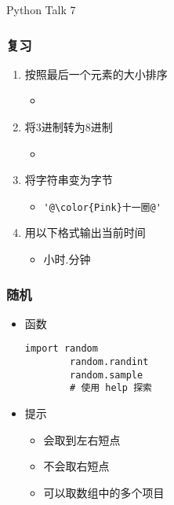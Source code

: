 


\begin{CJK}{UTF8}{gbsn}

\PreFirstFrame
\begin{frame} [fragile]
	\centerline{\fontsize{42}{42}\selectfont Python Talk 7}
\end{frame}
\PostFirstFrame

\begin{frame} [fragile]
	\frametitle{复习}
	\linespread{1.25}
	\begin{enumerate}
	\item 按照最后一个元素的大小排序
		\begin{itemize}
		\item {}
		\end{itemize}
	\item 将3进制转为8进制
		\begin{itemize}
		\item {}
		\end{itemize}
	\item 将字符串变为字节
		\begin{itemize}
		\item \begin{lstlisting}[style=pythonstyle, gobble=8, escapechar=@]
		'@\color{Pink}十一圈@'
		\end{lstlisting}
		\end{itemize}
	\item 用以下格式输出当前时间
		\begin{itemize}
		\item 小时.分钟
		\end{itemize}
	\end{enumerate}
\end{frame}

\begin{frame} [fragile]
	\frametitle{随机}
	\linespread{1.25}
	\begin{itemize}
	\item 函数
		\begin{lstlisting}[style=pythonstyle, gobble=8, texcl]
		import random
		random.randint
		random.sample
		# 使用 help 探索
		\end{lstlisting}
	\item 提示
		\begin{itemize}
		\item {} 会取到左右短点
		\item {} 不会取右短点
		\item {} 可以取数组中的多个项目
		\end{itemize}
	\end{itemize}
\end{frame}


\end{CJK}
